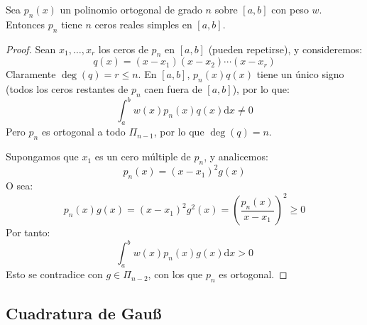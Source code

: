   \begin{theorem}
    \label{theo:polinomios-ortogonales-ceros}
    Sea \(p_n(x)\) un polinomio ortogonal de grado \(n\)
    sobre \([a, b]\) con peso \(w\).
    Entonces \(p_n\) tiene \(n\) ceros reales simples en \([a, b]\).
  \end{theorem}
  \begin{proof}
    Sean \(x_1, \dotsc, x_r\) los ceros de \(p_n\) en \([a, b]\)
    (pueden repetirse),
    y consideremos:
    \begin{equation*}
      q(x)
        = (x - x_1) (x - x_2) \dotsm (x - x_r)
    \end{equation*}
    Claramente \(\deg(q) = r \le n\).
    En \([a, b]\),
    \(p_n(x) q(x)\) tiene un único signo
    (todos los ceros restantes de \(p_n\) caen fuera de \([a, b]\)),
    por lo que:
    \begin{equation*}
      \int_a^b w(x) p_n(x) q(x) \mathrm{d} x
        \ne 0
    \end{equation*}
    Pero \(p_n\) es ortogonal a todo \(\Pi_{n - 1}\),
    por lo que \(\deg(q) = n\).

    Supongamos que \(x_1\) es un cero múltiple de \(p_n\),
    y analicemos:
    \begin{equation*}
      p_n(x)
        = (x - x_1)^2 g(x)
    \end{equation*}
    O sea:
    \begin{equation*}
      p_n(x) g(x)
        =   (x - x_1)^2 g^2(x)
        =   \left( \frac{p_n(x)}{x - x_1} \right)^2
        \ge 0
    \end{equation*}
    Por tanto:
    \begin{equation*}
      \int_a^b w(x) p_n(x) g(x) \mathrm{d} x
        > 0
    \end{equation*}
    Esto se contradice con \(g \in \Pi_{n - 2}\),
    con los que \(p_n\) es ortogonal.
  \end{proof}

\subsection{Cuadratura de Gauß}
\label{sec:cuadratura-Gauss}


